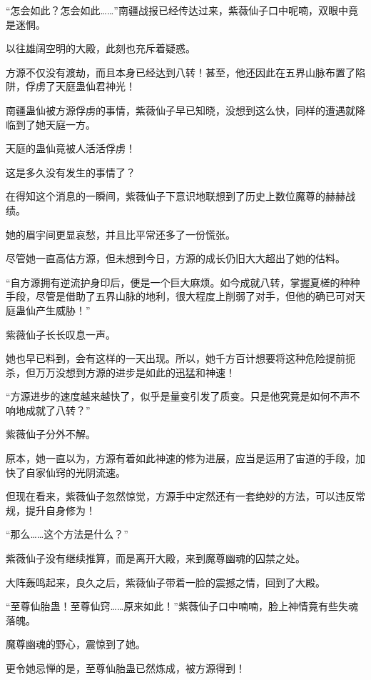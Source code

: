 
\begin{this_body}

“怎会如此？怎会如此……”南疆战报已经传达过来，紫薇仙子口中呢喃，双眼中竟是迷惘。

以往雄阔空明的大殿，此刻也充斥着疑惑。

方源不仅没有渡劫，而且本身已经达到八转！甚至，他还因此在五界山脉布置了陷阱，俘虏了天庭蛊仙君神光！

南疆蛊仙被方源俘虏的事情，紫薇仙子早已知晓，没想到这么快，同样的遭遇就降临到了她天庭一方。

天庭的蛊仙竟被人活活俘虏！

这是多久没有发生的事情了？

在得知这个消息的一瞬间，紫薇仙子下意识地联想到了历史上数位魔尊的赫赫战绩。

她的眉宇间更显哀愁，并且比平常还多了一份慌张。

尽管她一直高估方源，但未想到今日，方源的成长仍旧大大超出了她的估料。

“自方源拥有逆流护身印后，便是一个巨大麻烦。如今成就八转，掌握夏槎的种种手段，尽管是借助了五界山脉的地利，很大程度上削弱了对手，但他的确已可对天庭蛊仙产生威胁！”

紫薇仙子长长叹息一声。

她也早已料到，会有这样的一天出现。所以，她千方百计想要将这种危险提前扼杀，但万万没想到方源的进步是如此的迅猛和神速！

“方源进步的速度越来越快了，似乎是量变引发了质变。只是他究竟是如何不声不响地成就了八转？”

紫薇仙子分外不解。

原本，她一直以为，方源有着如此神速的修为进展，应当是运用了宙道的手段，加快了自家仙窍的光阴流速。

但现在看来，紫薇仙子忽然惊觉，方源手中定然还有一套绝妙的方法，可以违反常规，提升自身修为！

“那么……这个方法是什么？”

紫薇仙子没有继续推算，而是离开大殿，来到魔尊幽魂的囚禁之处。

大阵轰鸣起来，良久之后，紫薇仙子带着一脸的震撼之情，回到了大殿。

“至尊仙胎蛊！至尊仙窍……原来如此！”紫薇仙子口中喃喃，脸上神情竟有些失魂落魄。

魔尊幽魂的野心，震惊到了她。

更令她忌惮的是，至尊仙胎蛊已然炼成，被方源得到！


\end{this_body}
